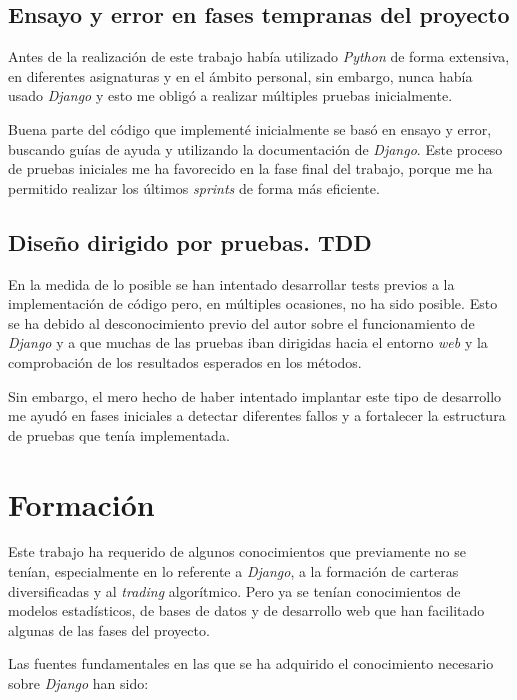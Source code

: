 \subsection{Ensayo y error en fases tempranas del proyecto}

Antes de la realización de este trabajo había utilizado \emph{Python} de forma extensiva, en diferentes asignaturas y en el ámbito personal, sin embargo, nunca había usado \emph{Django} y esto me obligó a realizar múltiples pruebas inicialmente. 

Buena parte del código que implementé inicialmente se basó en ensayo y error, buscando guías de ayuda y utilizando la documentación de \emph{Django}\citep{online:django_doc}. Este proceso de pruebas iniciales me ha favorecido en la fase final del trabajo, porque me ha permitido realizar los últimos \emph{sprints} de forma más eficiente. 

\subsection{Diseño dirigido por pruebas. TDD}

En la medida de lo posible se han intentado desarrollar tests previos a la implementación de código pero, en múltiples ocasiones, no ha sido posible. Esto se ha debido al desconocimiento previo del autor sobre el funcionamiento de \emph{Django} y a que muchas de las pruebas iban dirigidas hacia el entorno \emph{web} y la comprobación de los resultados esperados en los métodos. 

Sin embargo, el mero hecho de haber intentado implantar este tipo de desarrollo me ayudó en fases iniciales a detectar diferentes fallos y a fortalecer la estructura de pruebas que tenía implementada.



\section{Formación}\label{formación}

Este trabajo ha requerido de algunos conocimientos que previamente no se tenían, especialmente en lo referente a \emph{Django}, a la formación de carteras diversificadas y al \emph{trading} algorítmico. Pero ya se tenían conocimientos de modelos estadísticos, de bases de datos y de desarrollo web que han facilitado algunas de las fases del proyecto. 

Las fuentes fundamentales en las que se ha adquirido el conocimiento necesario sobre \emph{Django} han sido: 

